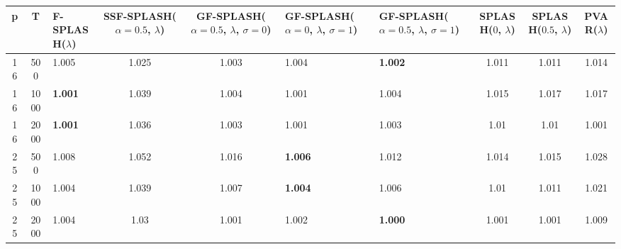 \begin{tabular}{cclccllccc}
\hline
  p  &  T   & F-SPLASH($\lambda$)   &  SSF-SPLASH($\alpha=0.5$, $\lambda$)  &  GF-SPLASH($\alpha=0.5$, $\lambda$, $\sigma=0$)  & GF-SPLASH($\alpha=0$, $\lambda$, $\sigma=1$)   & GF-SPLASH($\alpha=0.5$, $\lambda$, $\sigma=1$)   &  SPLASH($0$, $\lambda$)  &  SPLASH($0.5$, $\lambda$)  &  PVAR($\lambda$)  \\
\hline
 16  & 500  & 1.005                 &                 1.025                 &                      1.003                       & 1.004                                          & \textbf{1.002}                                   &          1.011           &           1.011            &       1.014       \\
 16  & 1000 & \textbf{1.001}        &                 1.039                 &                      1.004                       & 1.001                                          & 1.004                                            &          1.015           &           1.017            &       1.017       \\
 16  & 2000 & \textbf{1.001}        &                 1.036                 &                      1.003                       & 1.001                                          & 1.003                                            &           1.01           &            1.01            &       1.001       \\
 25  & 500  & 1.008                 &                 1.052                 &                      1.016                       & \textbf{1.006}                                 & 1.012                                            &          1.014           &           1.015            &       1.028       \\
 25  & 1000 & 1.004                 &                 1.039                 &                      1.007                       & \textbf{1.004}                                 & 1.006                                            &           1.01           &           1.011            &       1.021       \\
 25  & 2000 & 1.004                 &                 1.03                  &                      1.001                       & 1.002                                          & \textbf{1.000}                                   &          1.001           &           1.001            &       1.009       \\
\hline
\end{tabular}